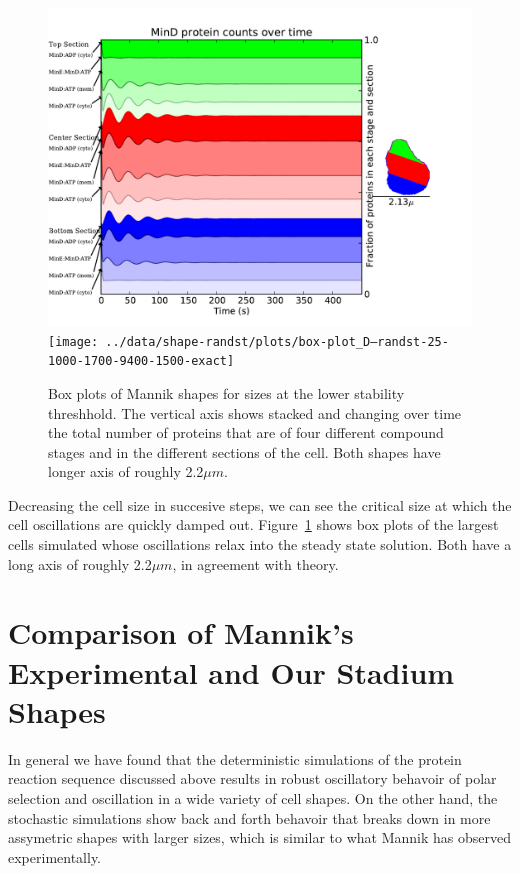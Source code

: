 \documentclass[letterpaper,twocolumn,amsmath,amssymb,pre]{revtex4-1}
\begin{document}
\begin{figure}
  \includegraphics[width=\columnwidth]{../data/shape-randst/plots/box-plot_D--randst-25-800-800-9500-1500-exact}
  \texttt{[image: ../data/shape-randst/plots/box-plot\_D--randst-25-1000-1700-9400-1500-exact]}
  \caption{Box plots of Mannik shapes for sizes at the lower stability
    threshhold.  The vertical axis shows stacked and changing over
    time the total number of proteins that are of four different
    compound stages and in the different sections of the cell.  Both
    shapes have longer axis of roughly 2.2$\mu m$.}
  \label{box-mannik}
\end{figure}

Decreasing the cell size in succesive steps, we can see the critical
size at which the cell oscillations are quickly damped out.
Figure~\ref{box-mannik} shows box plots of the largest cells simulated
whose oscillations relax into the steady state solution.  Both have a
long axis of roughly 2.2$\mu m$, in agreement with theory.


\section{Comparison of Mannik's Experimental and Our Stadium Shapes}
In general we have found that the deterministic simulations of the
protein reaction sequence discussed above results in robust
oscillatory behavoir of polar selection and oscillation in a wide
variety of cell shapes.  On the other hand, the stochastic simulations
show back and forth behavoir that breaks down in more assymetric
shapes with larger sizes, which is similar to what Mannik has observed
experimentally.
\end{document}
